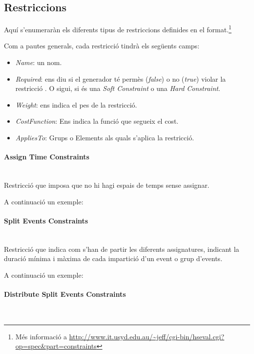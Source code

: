 \documentclass[11pt,a4paper,twoside]{report}
\begin{document}
  \subsection{Restriccions}

  Aquí s'enumeraràn els diferents tipus de restriccions definides en el format.\footnote{Més informació a \url{http://www.it.usyd.edu.au/~jeff/cgi-bin/hseval.cgi?op=spec&part=constraints}} 

  Com a pautes generals, cada restricció tindrà els següents camps:
  \begin{itemize}
    \item \textit{Name}: un nom.
    \item \textit{Required}: ens diu si el generador té permès (\textit{false}) o no (\textit{true}) violar la restricció . 
        O sigui, si és una \textit{Soft Constraint} o una \textit{Hard Constraint}.
    \item \textit{Weight}: ens indica el pes de la restricció.
    \item \textit{CostFunction}: Ens indica la funció que segueix el cost.
    \item \textit{AppliesTo}: Grups o Elements als quals s'aplica la restricció.
  \end{itemize}

  \paragraph*{Assign Time Constraints} ~\\

  Restricció que imposa que no hi hagi espais de temps sense assignar.

  A continuació un exemple:

  


  \paragraph*{Split Events Constraints} ~\\
  
  Restricció que indica com s'han de partir les diferents assignatures, indicant la duració mínima i màxima de cada impartició d'un event o grup d'events.

  A continuació un exemple:

  

  \paragraph*{Distribute Split Events Constraints} ~\\
\end{document}
